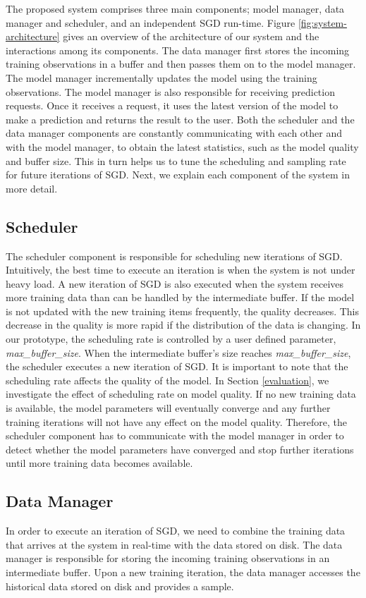 \documentclass{vldb}
\begin{document}
The proposed system comprises three main components; model manager, data manager and scheduler, and an independent SGD run-time. 
Figure \ref{fig:system-architecture} gives an overview of the architecture of our system and the interactions among its components.
The data manager first stores the incoming training observations in a buffer and then passes them on to the model manager.
The model manager incrementally updates the model using the training observations.
The model manager is also responsible for receiving prediction requests.
Once it receives a request, it uses the latest version of the model to make a prediction and returns the result to the user.
Both the scheduler and the data manager components are constantly communicating with each other and with the model manager, to obtain the latest statistics, such as the model quality and buffer size.
This in turn helps us to tune the scheduling and sampling rate for future iterations of SGD. 
Next, we explain each component of the system in more detail.

\subsection{Scheduler}\label{scheduler}
The scheduler component is responsible for scheduling new iterations of SGD.
Intuitively, the best time to execute an iteration is when the system is not under heavy load.
A new iteration of SGD is also executed when the system receives more training data than can be handled by the intermediate buffer.
If the model is not updated with the new training items frequently, the quality decreases.
This decrease in the quality is more rapid if the distribution of the data is changing.
In our prototype, the scheduling rate is controlled by a user defined parameter, \textit{max\_buffer\_size}.
When the intermediate buffer's size reaches \textit{max\_buffer\_size}, the scheduler executes a new iteration of SGD.
It is important to note that the scheduling rate affects the quality of the model.
In Section \ref{evaluation}, we investigate the effect of scheduling rate on model quality.
If no new training data is available, the model parameters will eventually converge and any further training iterations will not have any effect on the model quality.
Therefore, the scheduler component has to communicate with the model manager in order to detect whether the model parameters have converged and stop further iterations until more training data becomes available.

\subsection{Data Manager} \label{data-manager}
In order to execute an iteration of SGD, we need to combine the training data that arrives at the system in real-time with the data stored on disk.
The data manager is responsible for storing the incoming training observations in an intermediate buffer.
Upon a new training iteration, the data manager accesses the historical data stored on disk and provides a sample.
\end{document}
